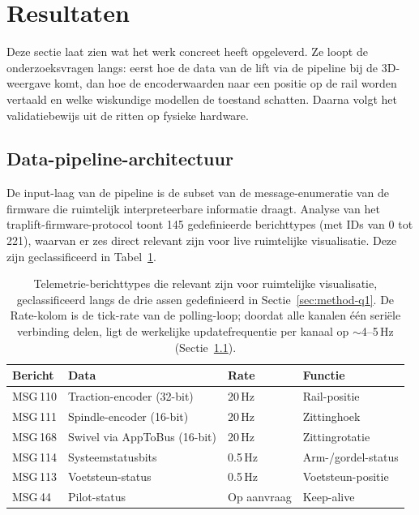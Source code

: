 \documentclass[10pt, a4paper, twocolumn]{article}
\begin{document}
\section{Resultaten}
\label{sec:results}

Deze sectie laat zien wat het werk concreet heeft opgeleverd. Ze loopt de
onderzoeksvragen langs: eerst hoe de data van de lift via de pipeline bij de
3D-weergave komt, dan hoe de encoderwaarden naar een positie op de rail worden
vertaald en welke wiskundige modellen de toestand schatten. Daarna volgt het
validatiebewijs uit de ritten op fysieke hardware.

\subsection{Data-pipeline-architectuur}
\label{sec:results-q1}
De input-laag van de pipeline is de subset van de message-enumeratie van de
firmware die ruimtelijk interpreteerbare informatie draagt. Analyse van het
traplift-firmware-protocol toont 145 gedefinieerde berichttypes (met IDs van 0
tot 221), waarvan er zes direct relevant zijn voor live ruimtelijke
visualisatie. Deze zijn geclassificeerd in Tabel~\ref{tab:telemetry}.

\begin{table}[t]
\centering
\caption{Telemetrie-berichttypes die relevant zijn voor ruimtelijke visualisatie, geclassificeerd langs de drie assen gedefinieerd in Sectie~\ref{sec:method-q1}. De Rate-kolom is de tick-rate van de polling-loop; doordat alle kanalen één seriële verbinding delen, ligt de werkelijke updatefrequentie per kanaal op $\sim$4--5\,Hz (Sectie~\ref{sec:results-q1}).}
\label{tab:telemetry}
\small
\begin{tabular}{@{}llll@{}}
\toprule
\textbf{Bericht} & \textbf{Data} & \textbf{Rate} & \textbf{Functie} \\
\midrule
MSG\,110 & Traction-encoder (32-bit) & 20\,Hz & Rail-positie \\
MSG\,111 & Spindle-encoder (16-bit) & 20\,Hz & Zittinghoek \\
MSG\,168 & Swivel via AppToBus (16-bit) & 20\,Hz & Zittingrotatie \\
MSG\,114 & Systeemstatusbits & 0.5\,Hz & Arm-/gordel-status \\
MSG\,113 & Voetsteun-status & 0.5\,Hz & Voetsteun-positie \\
MSG\,44  & Pilot-status & Op aanvraag & Keep-alive \\
\bottomrule
\end{tabular}
\end{table}
\end{document}
